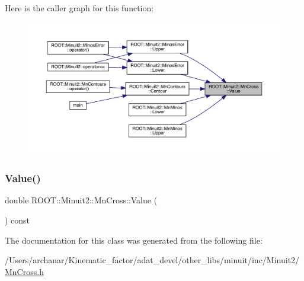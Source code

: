 Here is the caller graph for this function\+:\nopagebreak
\begin{figure}[H]
\begin{center}
\leavevmode
\includegraphics[width=350pt]{d3/db2/classROOT_1_1Minuit2_1_1MnCross_af7cebab3edb3fedaf0e4ce0704e1196f_icgraph}
\end{center}
\end{figure}
\mbox{\label{classROOT_1_1Minuit2_1_1MnCross_af7cebab3edb3fedaf0e4ce0704e1196f}} 
\subsubsection{\texorpdfstring{Value()}{Value()}\hspace{0.1cm}{\footnotesize\ttfamily [2/2]}}
{\footnotesize\ttfamily double R\+O\+O\+T\+::\+Minuit2\+::\+Mn\+Cross\+::\+Value (\begin{DoxyParamCaption}{ }\end{DoxyParamCaption}) const\hspace{0.3cm}{\ttfamily [inline]}}



The documentation for this class was generated from the following file\+:\begin{DoxyCompactItemize}
\item 
/\+Users/archanar/\+Kinematic\+\_\+factor/adat\+\_\+devel/other\+\_\+libs/minuit/inc/\+Minuit2/\mbox{\hyperlink{other__libs_2minuit_2inc_2Minuit2_2MnCross_8h}{Mn\+Cross.\+h}}\end{DoxyCompactItemize}

